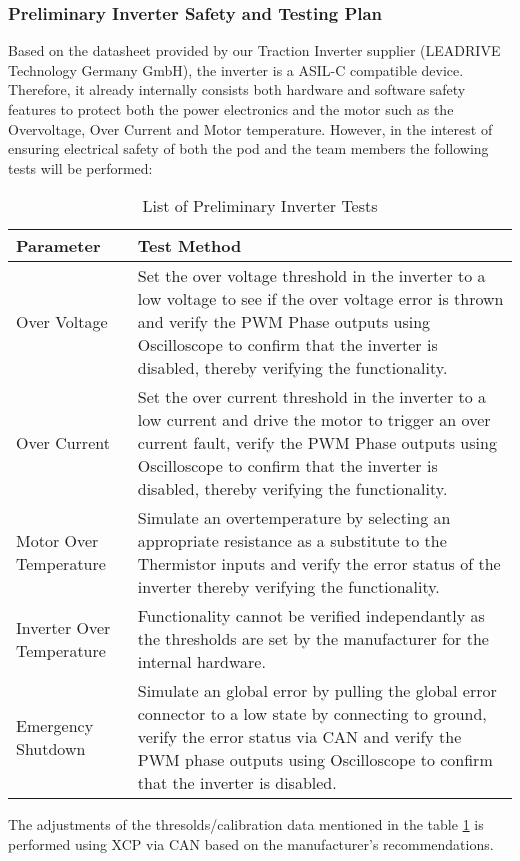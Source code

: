\subsubsection{Preliminary Inverter Safety and Testing Plan}
Based on the datasheet provided by our Traction Inverter supplier (LEADRIVE Technology Germany GmbH), the inverter is a ASIL-C compatible device. Therefore, it already internally consists both hardware and software safety features to protect both the power electronics and the motor such as the Overvoltage, Over Current and Motor temperature. However, in the interest of ensuring electrical safety of both the pod and the team members the following tests will be performed:

\begin{table}[H]
    \centering
    \begin{adjustbox}{width=\textwidth}
    \begin{tabular}{|p{7.5cm}|p{10cm}|}
        \hline
        \textbf{Parameter} & \textbf{Test Method} \\
        \hline
        Over Voltage & Set the over voltage threshold in the inverter to a low voltage to see if the over voltage error is thrown and verify the PWM Phase outputs using Oscilloscope to confirm that the inverter is disabled, thereby verifying the functionality.\\
	\hline
	Over Current & Set the over current threshold in the inverter to a low current and drive the motor to trigger an over current fault, verify the PWM Phase outputs using Oscilloscope to confirm that the inverter is disabled, thereby verifying the functionality.\\
	\hline
	Motor Over Temperature &  Simulate an overtemperature by selecting an appropriate resistance as a substitute to the Thermistor inputs and verify the error status of the inverter thereby verifying the functionality.\\
	\hline
	Inverter Over Temperature & Functionality cannot be verified independantly as the thresholds are set by the manufacturer for the internal hardware.\\
         \hline
	Emergency Shutdown & Simulate an global error by pulling the global error connector to a low state by connecting to ground, verify the error status via CAN and verify the PWM phase outputs using Oscilloscope to confirm that the inverter is disabled.\\
	\hline
    \end{tabular}
    \end{adjustbox}
    \label{tab:preliminvtest}
    \caption{List of Preliminary Inverter Tests}
    
\end{table}

\noindent
The adjustments of the thresolds/calibration data mentioned in the table \ref{tab:preliminvtest} is performed using XCP via CAN based on the manufacturer's recommendations.